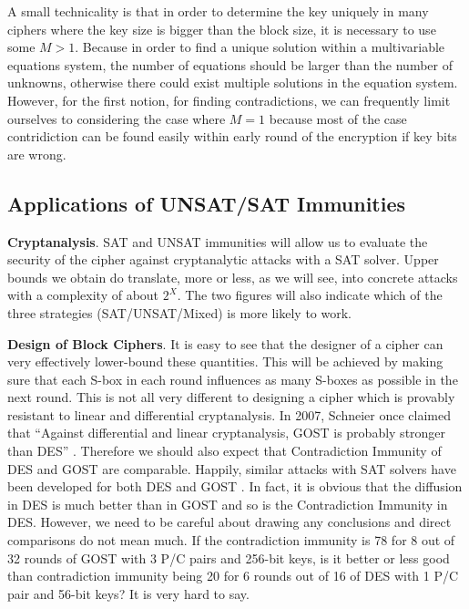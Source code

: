 A small technicality is that in order to determine the key uniquely
in many ciphers where the key size is bigger than the block size,
it is necessary to use some $M>1$. Because in order to find a unique solution within a multivariable equations system, the number of equations should be larger than the number of unknowns, otherwise there could exist multiple solutions in the equation system. However, for the first notion, for finding contradictions,
we can frequently limit ourselves to considering the case where $M=1$ because most of the case contridiction can be found easily within early round of the encryption if key bits are wrong.


\subsection{Applications of UNSAT/SAT Immunities}
\noindent 
{\bf Cryptanalysis}. %
SAT and UNSAT immunities will allow us to evaluate the security of the cipher against cryptanalytic attacks with a SAT solver. Upper bounds we obtain do translate, more or less, as we will see,
into concrete attacks with a complexity of about $2^{X}$. The two figures will also indicate which of the three
strategies (SAT/UNSAT/Mixed) is more likely to work.

\noindent
{\bf Design of Block Ciphers}.
It is easy to see that the designer of a cipher can very effectively lower-bound these quantities.
This will be achieved by making sure
that each S-box in each round
influences as many S-boxes as possible in the next round.
This is not all very different to designing a cipher
which is provably resistant to linear and differential cryptanalysis.
In 2007, Schneier once claimed that ``Against differential and linear cryptanalysis, GOST is probably stronger than DES''
\cite{schneier2007applied}.
Therefore we should also expect that Contradiction Immunity
of DES and GOST are comparable.
Happily, similar attacks with SAT solvers have been developed
for both DES \cite{DEScourtois} and GOST \cite{OptimiPaper}.
In fact, it is obvious that the diffusion in DES
is much better than in GOST and so is the Contradiction Immunity in DES.
However, we need to be careful about drawing any conclusions
and direct comparisons do not mean much.
If the contradiction immunity is 78 for 8 out of 32 rounds of GOST with 3 P/C pairs and 256-bit keys,
is it better or less good
than contradiction immunity
being 20 for 6 rounds out of 16 of DES with 1 P/C pair and 56-bit keys?
It is very hard to say.

